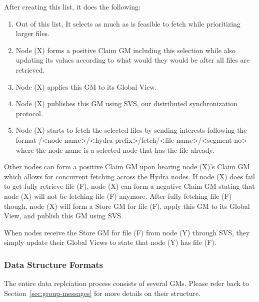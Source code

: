 After creating this list, it does the following:
\begin{enumerate}
    \item Out of this list, It selects as much as is feasible to fetch while prioritizing larger files.
    \item Node (X) forms a positive Claim GM including this selection while also updating its values according to what would they would be after all files are retrieved.
    \item Node (X) applies this GM to its Global View.
    \item Node (X) publishes this GM using SVS, our distributed synchronization protocol.
    \item Node (X) starts to fetch the selected files by sending interests following the format /<node-name>/<hydra-prefix>/fetch/<file-name>/<segment-no> where the node name is a 
    selected node that has the file already.
\end{enumerate}

Other nodes can form a positive Claim GM upon hearing node (X)'s Claim GM which allows for concurrent fetching across the Hydra nodes. If node (X) does fail to get fully retrieve file (F), node (X) can form a negative Claim GM stating that node (X) will not be fetching file (F) anymore.  After fully fetching file (F) though, node (X) will form a Store GM for file (F), apply this GM to its Global View, and publish this GM using SVS.

When nodes receive the Store GM for file (F) from node (Y) through SVS, they simply update their Global Views to state that node (Y) has file (F).


\subsubsection{Data Structure Formats}
The entire data replciation process consists of several GMs. Please refer back to Section~\ref{sec:group-messages} for more details on their structure.